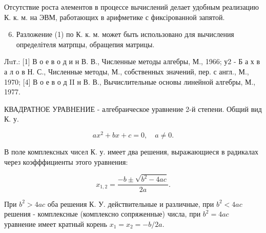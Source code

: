 \documentclass[10pt]{article}
\begin{document}
Отсутствие роста әлементов в процессе вычислений делает удобным реализацию К. к. м. на ЭВМ, работающих в арифметике с фиксірованной запятой.



\begin{enumerate}

  \setcounter{enumi}{5}

  \item Разложение (1) по К. к. м. может быть использовано для вычисления определітеля матрпцы, обращепия матрицы.

\end{enumerate}



Лuт.: [1] В о е в о д и н В. В., Численные методы алгебры, М., 1966; у2 - Б а х в а л о в Н. С., Численные методы, М., собственных значений, пер. с англ., М., 1970; [4] В о е в о д II н В. В., Вычислительные основы линейной алгебры, М., 1977.



КВАДРАТНОЕ УРАВНЕНИЕ - алгебраическое уравнение 2-й степени. Общий вид К. у.



\[

a x^{2}+b x+c=0, \quad a \neq 0 .

\]



В поле комплексных чисел К. у. имеет два решения, выражающиеся в радикалах через коэфффициенты этого уравнения:



\[

x_{1,2}=\frac{-b \pm \sqrt{b^{2}-4 a c}}{2 a} .

\]



При $b^{2}>4 a c$ оба решения К. У. действительные и различные, при $b^{2}<4 a c$ решения - комплексные (комплексно сопряженные) числа, при $b^{2}=4 a c$ уравнение имеет кратный корень $x_{1}=x_{2}=-b / 2 a$.
\end{document}
